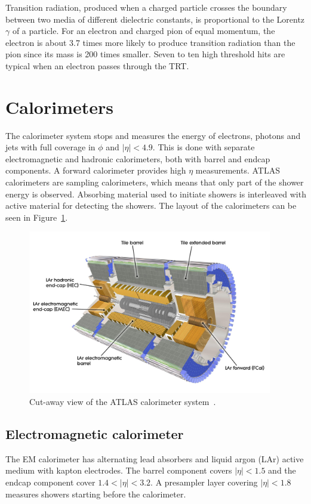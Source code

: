 Transition radiation, produced when a charged particle crosses the boundary between two media of different dielectric constants, is proportional to the Lorentz $\gamma$ of a particle. For an electron and charged pion of equal momentum, the electron is about 3.7 times more likely to produce transition radiation than the pion since its mass is 200 times smaller. Seven to ten high threshold hits are typical when an electron passes through the TRT. 



\section{Calorimeters}
The calorimeter system  stops and measures the energy of electrons, photons and jets with full coverage in $\phi$ and $|\eta|<4.9$. This is done with separate electromagnetic and hadronic calorimeters, both with barrel and endcap components. A forward calorimeter provides high $\eta$ measurements. ATLAS calorimeters are sampling calorimeters, which means that only part of the shower energy is observed. Absorbing material used to initiate showers is interleaved with active material for detecting the showers. The layout of the calorimeters can be seen in Figure~\ref{fig:calo}. 

\begin{figure}[tp]
  \centering
  \includegraphics[width=0.95\textwidth]{fig/atlas/combinedCalo}
  \caption{Cut-away view of the ATLAS calorimeter system~\cite{cern-jinst-atlas}.}
  \label{fig:calo}
\end{figure}
\subsection{Electromagnetic calorimeter}
The EM calorimeter has alternating lead absorbers and liquid argon (LAr) active medium with kapton electrodes. The barrel component covers $|\eta| < 1.5$ and the endcap component cover $1.4 < |\eta| < 3.2$. A presampler layer covering $|\eta| < 1.8$ measures showers starting before the calorimeter. 

